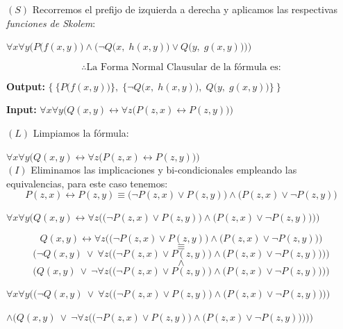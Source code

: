 \documentclass[12pt,letterpaper]{article}
\begin{document}
\begin{enumerate}
  $(S)$ Recorremos el prefijo de izquierda a derecha y aplicamos las respectivas \textit{funciones de Skolem}:
  
  \quad {} $\forall x \forall y \bigg(P\big(f(x, y) \big) \land \Big(\neg Q\big(x,\; h(x, y)\big) \lor Q\big(y,\; g(x, y)\big)\Big)\bigg)$

  \[
  \therefore \text{La Forma Normal Clausular de la f\'{o}rmula es:}
  \]

  \begin{center}
    \textbf{Output:} $\big\{\: \{P\big(f(x, y)\big)\},\; \{\neg Q\big(x,\; h(x, y)\big),\; Q\big(y,\; g(x, y)\big) \}\: \big\}$
  \end{center}

  \newpage
  
  \textbf{Input:} \( \forall x \forall y \Big( Q(x,y) \leftrightarrow \forall z \big(P(z,x) \leftrightarrow P(z,y)\big) \Big) \)

  $(L)$ Limpiamos la f\'{o}rmula: \checkmark

  \quad {} $\forall x \forall y \Big( Q(x,y) \leftrightarrow \forall z \big(P(z,x) \leftrightarrow P(z,y)\big) \Big)$
  \\
  
  $(I)$ Eliminamos las implicaciones y bi-condicionales empleando las equivalencias, para este caso tenemos:
  \[
  P(z,x) \leftrightarrow P(z,y) \equiv \big(\neg P(z,x) \lor P(z,y) \big) \land \big(P(z,x) \lor \neg P(z,y) \big)
  \]

  \quad {} $\forall x \forall y \bigg( Q(x,y) \leftrightarrow \forall z \Big( \big(\neg P(z,x) \lor P(z,y) \big) \land \big(P(z,x) \lor \neg P(z,y) \big) \Big) \bigg)$

  \[
  Q(x,y) \leftrightarrow \forall z \Big( \big(\neg P(z,x) \lor P(z,y) \big) \land \big(P(z,x) \lor \neg P(z,y) \big) \Big)
  \]
  \[
  \equiv
  \]
  \[
  \bigg(\neg Q(x,y) \: \lor \: \forall z \Big( \big(\neg P(z,x) \lor P(z,y) \big) \land \big(P(z,x) \lor \neg P(z,y) \big) \Big)\bigg)
  \]
  \[
  \land
  \]
  \[
  \bigg( Q(x,y) \: \lor \: \neg \forall z \Big( \big(\neg P(z,x) \lor P(z,y) \big) \land \big(P(z,x) \lor \neg P(z,y) \big) \Big) \bigg)
  \]

  \quad {} $\forall x \forall y \Bigg (\bigg(\neg Q(x,y) \: \lor \: \forall z \Big( \big(\neg P(z,x) \lor P(z,y) \big) \land \big(P(z,x) \lor \neg P(z,y) \big) \Big)\bigg)$

  \hspace{2cm} $\land \bigg( Q(x,y) \: \lor \: \neg \forall z \Big( \big(\neg P(z,x) \lor P(z,y) \big) \land \big(P(z,x) \lor \neg P(z,y) \big) \Big) \bigg)\Bigg)$
  \\


\end{enumerate}
\end{document}
